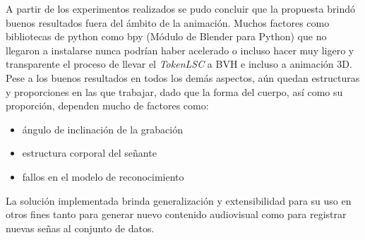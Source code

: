 A partir de los experimentos realizados se pudo concluir que la propuesta brindó buenos resultados fuera del ámbito de la animación. Muchos factores como bibliotecas de python como bpy (Módulo de Blender para Python) que no llegaron a instalarse nunca podrían haber acelerado o incluso hacer muy ligero y transparente el proceso de llevar el \textit{TokenLSC} a BVH e incluso a animación 3D.
Pese a los buenos resultados en todos los demás aspectos, aún quedan estructuras y proporciones en las que trabajar, dado que la forma del cuerpo, así como su proporción, dependen mucho de factores como:
\begin{itemize}
\item ángulo de inclinación de la grabación
\item estructura corporal del señante
\item fallos en el modelo de reconocimiento
\end{itemize}
La solución implementada brinda generalización y extensibilidad para su uso en otros fines tanto para generar nuevo contenido audiovisual como para registrar nuevas señas al conjunto de datos.




